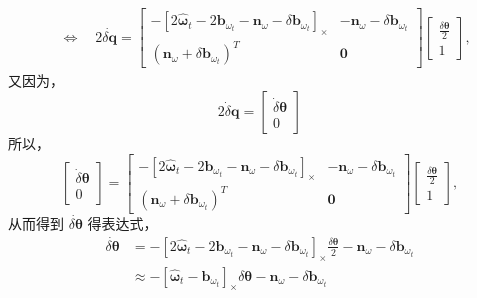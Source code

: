 \begin{equation}
\begin{aligned}
& \Leftrightarrow \quad 2\dot{\delta \mathbf{q}} = 
\left[ \begin{array}
{cc}{-\left[2 \hat{\bm{\omega}}_{t}-2 \mathbf{b}_{\omega_{t}}-\mathbf{n}_{\omega}-\delta \mathbf{b}_{\omega_{t}}\right]_\times} & {-\mathbf{n}_{\omega}-\delta \mathbf{b}_{\omega_{t}}} \\ 
{\left(\mathbf{n}_{\omega}+\delta \mathbf{b}_{\omega_{t}}\right)^{T}} & {\bm{0}}
\end{array}\right]
\begin{bmatrix}
\frac{\delta \bm{\theta}}{2} \\
1
\end{bmatrix},
\end{aligned}     
\end{equation}
又因为，
\begin{equation}
\label{eqn:3.30}
2 \dot{\delta} \mathbf{q}= \left[ \begin{array}{c}{\dot{\delta} \bm{\theta}} \\ {0}\end{array}\right]
\end{equation}
所以，
\begin{equation}
\label{eqn:3.31}
\left[ \begin{array}{c}{\dot{\delta} \bm{\theta}} \\ {0}\end{array}\right]
=\left[ \begin{array}
{cc}{ -\left[2 \hat{\bm{\omega}}_{t}-2 \mathbf{b}_{\omega_{t}}-\mathbf{n}_{\omega}-\delta \mathbf{b}_{\omega_{t}}\right]_\times } & {-\mathbf{n}_{\omega}-\delta \mathbf{b}_{\omega_{t}}} \\ 
{\left(\mathbf{n}_{\omega}+\delta \mathbf{b}_{\omega_{t}}\right)^{T}} & {\bm{0}}
\end{array}\right]
\begin{bmatrix}
\frac{\delta \bm{\theta}}{2} \\
1
\end{bmatrix},   
\end{equation}
从而得到 $\dot{\delta \bm{\theta} }$ 得表达式，
\begin{equation}
\label{eqn:3.32}
\begin{aligned}
\dot{\delta \bm{\theta}} &=
-\left[2 \hat{\bm{\omega}}_{t}-2 \mathbf{b}_{\omega_{t}}-\mathbf{n}_{\omega}-\delta \mathbf{b}_{\omega_{t}}\right]_\times \frac{\delta \bm{\theta}}{2}-\mathbf{n}_{\omega}-\delta \mathbf{b}_{\omega_{t}} \\
& \approx-\left[\hat{\bm{\omega}}_{t}-\mathbf{b}_{\omega_{t}}\right]_\times \delta \bm{\theta}-\mathbf{n}_{\omega}-\delta \mathbf{b}_{\omega_{t}}
\end{aligned}
\end{equation}
